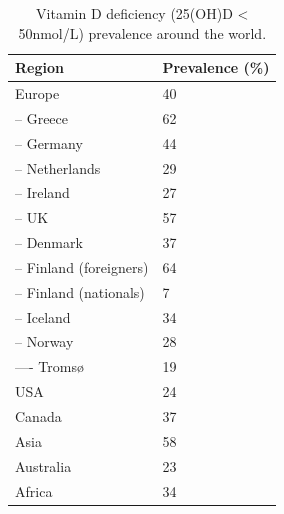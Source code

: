 \begin{table}[h! ]

    \caption{Vitamin D deficiency (25(OH)D < 50nmol/L) prevalence around the world.}	
	\centering

	\begin{tabular}{|ll|}
	\hline
	\rowcolor[HTML]{FFCCCC} 
	Region                  & Prevalence (\%) \\ \hline

	Europe \cite{ref:B_Amrein2020}                 & 40              \\
	\rowcolor[HTML]{EFEFEF} 
	-- Greece \cite{ref:A_Cashman2016}              & 62              \\
	-- Germany \cite{ref:A_Cashman2016}              & 44              \\
	\rowcolor[HTML]{EFEFEF} 
	-- Netherlands \cite{ref:A_Cashman2016}          & 29              \\
	-- Ireland \cite{ref:A_Cashman2016}              & 27              \\
	\rowcolor[HTML]{EFEFEF} 
	-- UK  \cite{ref:A_Cashman2016}                 & 57              \\
	-- Denmark \cite{ref:A_Cashman2016}             & 37              \\
	\rowcolor[HTML]{EFEFEF} 
	-- Finland (foreigners) \cite{ref:A_Cashman2016} & 64              \\
	-- Finland (nationals) \cite{ref:A_Cashman2016}  & 7               \\
	\rowcolor[HTML]{EFEFEF} 
	-- Iceland      \cite{ref:A_Cashman2016}        & 34              \\
	-- Norway  \cite{ref:A_Cashman2016}             & 28              \\
	\rowcolor[HTML]{EFEFEF} 
	---- Tromsø   \cite{ref:A_Cashman2016}          & 19              \\
	
	USA \cite{ref:B_Amrein2020}                    & 24              \\
	\rowcolor[HTML]{EFEFEF} 
	Canada \cite{ref:B_Amrein2020}                  & 37              \\	
	
	Asia \cite{ref:C_Jiang2021}                    & 58              \\
	\rowcolor[HTML]{EFEFEF} 
	Australia    \cite{ref:A_Cashman2016}           & 23              \\
	Africa  \cite{ref:D_Mogire2020}                & 34              \\ \hline
	
	\end{tabular}
 
	\label{tab:vitDeficiencyTable}
	
	
\end{table}

